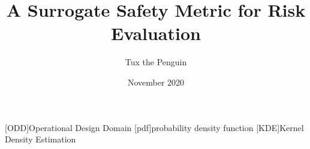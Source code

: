 \documentclass{article}
\title{A Surrogate Safety Metric for Risk Evaluation}
\author{Tux the Penguin}
\date{November 2020}
\begin{document}
\begin{acronym}[AAAAAAAA]
	[ODD]{Operational Design Domain}
	[pdf]{probability density function}
	[KDE]{Kernel Density Estimation}
\end{acronym}

\maketitle











\printbibliography
\end{document}
